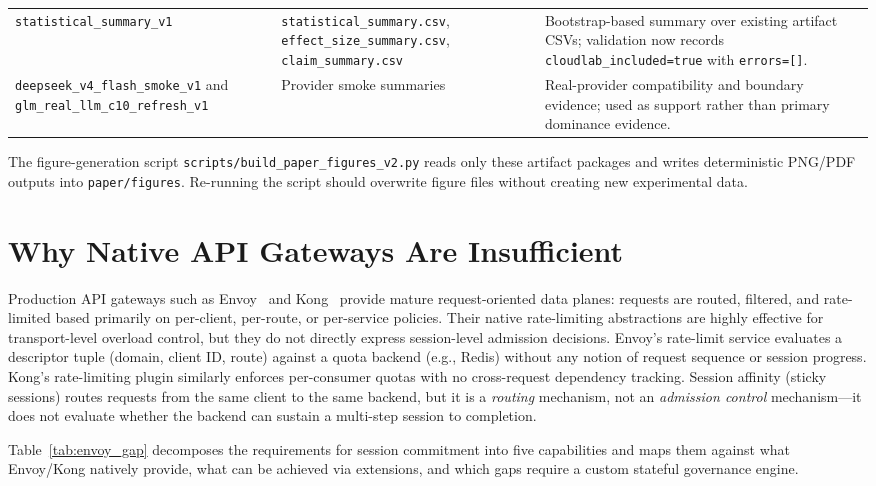 \documentclass[sigconf,anonymous]{acmart}
\begin{document}
\begin{table}[h]
{\begin{tabular}{@{}p{3.0cm}p{5.0cm}p{5.6cm}@{}}
\texttt{statistical\_summary\_v1} & \texttt{statistical\_summary.csv}, \texttt{effect\_size\_summary.csv}, \texttt{claim\_summary.csv} & Bootstrap-based summary over existing artifact CSVs; validation now records \texttt{cloudlab\_included=true} with \texttt{errors=[]}. \\
\texttt{deepseek\_v4\_flash\_smoke\_v1} and \texttt{glm\_real\_llm\_c10\_refresh\_v1} & Provider smoke summaries & Real-provider compatibility and boundary evidence; used as support rather than primary dominance evidence. \\
\bottomrule
\end{tabular}}
\end{table}

The figure-generation script \texttt{scripts/build\_paper\_figures\_v2.py} reads only these artifact packages and writes deterministic PNG/PDF outputs into \texttt{paper/figures}. Re-running the script should overwrite figure files without creating new experimental data.

\section{Why Native API Gateways Are Insufficient}
\label{sec:envoy_analysis}

Production API gateways such as Envoy~\cite{envoy} and Kong~\cite{kong} provide mature request-oriented data planes: requests are routed, filtered, and rate-limited based primarily on per-client, per-route, or per-service policies. Their native rate-limiting abstractions are highly effective for transport-level overload control, but they do not directly express session-level admission decisions. Envoy's rate-limit service evaluates a descriptor tuple (domain, client ID, route) against a quota backend (e.g., Redis) without any notion of request sequence or session progress. Kong's rate-limiting plugin similarly enforces per-consumer quotas with no cross-request dependency tracking. Session affinity (sticky sessions) routes requests from the same client to the same backend, but it is a \emph{routing} mechanism, not an \emph{admission control} mechanism---it does not evaluate whether the backend can sustain a multi-step session to completion.

Table~\ref{tab:envoy_gap} decomposes the requirements for session commitment into five capabilities and maps them against what Envoy/Kong natively provide, what can be achieved via extensions, and which gaps require a custom stateful governance engine.
\end{document}
